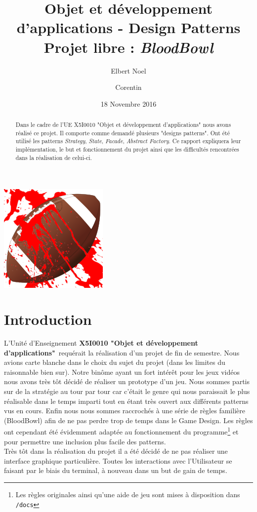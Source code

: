 \documentclass{article}
\title{Objet et développement d'applications - Design Patterns\\
Projet libre : \emph{BloodBowl}}
\author{Elbert Noel \bsc{Nyunting} \and Corentin \bsc{Chédotal}}
\date{18 Novembre 2016}
\newcommand{\info}{\texttt}
\newcommand{\pattern}{\emph}
\newcommand{\ue}{\textbf{X5I0010 "Objet et développement d'applications"}}
\begin{document}
\begin{titlepage}

\maketitle
\thispagestyle{empty}

\vspace{2cm}
\centerline{\includegraphics[scale=0.75]{img/logo.png}}
\vspace{2cm}

\begin{abstract}
    Dans le cadre de l'UE X5I0010 "Objet et développement d'applications" nous avons réalisé ce projet. Il comporte comme demandé plusieurs "designs patterns". Ont été utilisé les patterns \pattern{Strategy}, \pattern{State}, \pattern{Facade}, \pattern{Abstract Factory}. Ce rapport expliquera leur implémentation, le but et fonctionnement du projet ainsi que les difficultés rencontrées dans la réalisation de celui-ci.
\end{abstract}
\end{titlepage}

\newpage

\tableofcontents
\thispagestyle{empty}
\clearpage

\newpage

\section{Introduction}
    
    L'Unité d'Enseignement \ue\ requérait la réalisation d'un projet de fin de semestre. Nous avions carte blanche dans le choix du sujet du projet (dans les limites du raisonnable bien sur). Notre binôme ayant un fort intérêt pour les jeux vidéos nous avons très tôt décidé de réaliser un prototype d'un jeu. Nous sommes partis sur de la stratégie au tour par tour car c'était le genre qui nous paraissait le plus réalisable dans le temps imparti tout en étant très ouvert aux différents patterns vus en cours. Enfin nous nous sommes raccrochés à une série de règles familière (BloodBowl) afin de ne pas perdre trop de temps dans le Game Design. Les règles ont cependant été évidemment adaptée au fonctionnement du programme\footnote{Les règles originales ainsi qu'une aide de jeu sont mises à disposition dans \info{/docs}} et pour permettre une inclusion plus facile des patterns.\\
    Très tôt dans la réalisation du projet il a été décidé de ne pas réaliser une interface graphique particulière. Toutes les interactions avec l'Utilisateur se faisant par le biais du terminal, à nouveau dans un but de gain de temps.
\end{document}
